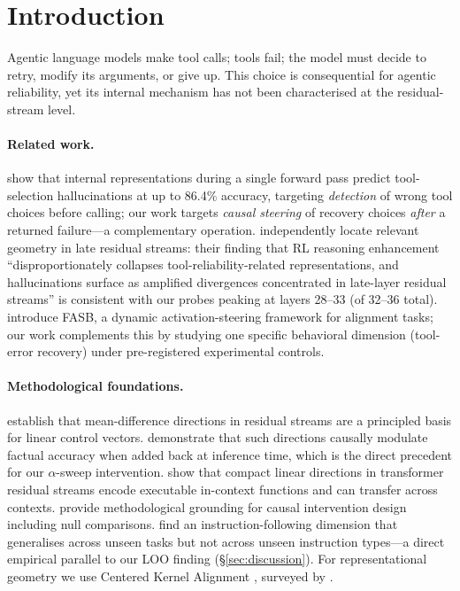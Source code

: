 \documentclass{article}
\begin{document}
\section{Introduction}
\label{sec:intro}

Agentic language models make tool calls; tools fail; the model must
decide to retry, modify its arguments, or give up.  This choice is
consequential for agentic reliability, yet its internal mechanism has
not been characterised at the residual-stream level.

\paragraph{Related work.}
\citet{healy2026internal} show that internal representations during a
single forward pass predict tool-selection hallucinations at up to
86.4\% accuracy, targeting \emph{detection} of wrong tool choices
before calling; our work targets \emph{causal steering} of recovery
choices \emph{after} a returned failure---a complementary operation.
\citet{yin2025reasoning} independently locate relevant geometry in
late residual streams: their finding that RL reasoning enhancement
``disproportionately collapses tool-reliability-related representations,
and hallucinations surface as amplified divergences concentrated in
late-layer residual streams'' is consistent with our probes peaking
at layers 28--33 (of 32--36 total).
\citet{cheng2025steering} introduce FASB, a dynamic activation-steering
framework for alignment tasks; our work complements this by studying
one specific behavioral dimension (tool-error recovery) under
pre-registered experimental controls.

\paragraph{Methodological foundations.}
\citet{zou2023representation} establish that mean-difference directions
in residual streams are a principled basis for linear control vectors.
\citet{li2023inference} demonstrate that such directions causally
modulate factual accuracy when added back at inference time, which is
the direct precedent for our $\alpha$-sweep intervention.
\citet{todd2024function} show that compact linear directions in
transformer residual streams encode executable in-context functions and
can transfer across contexts.
\citet{heimersheim2024activation} provide methodological grounding for
causal intervention design including null comparisons.
\citet{heo2024llms} find an instruction-following dimension that
generalises across unseen tasks but not across unseen instruction
types---a direct empirical parallel to our LOO finding (\S\ref{sec:discussion}).
For representational geometry we use Centered Kernel Alignment
\citep{kornblith2019similarity}, surveyed by \citet{klabunde2023similarity}.
\end{document}
